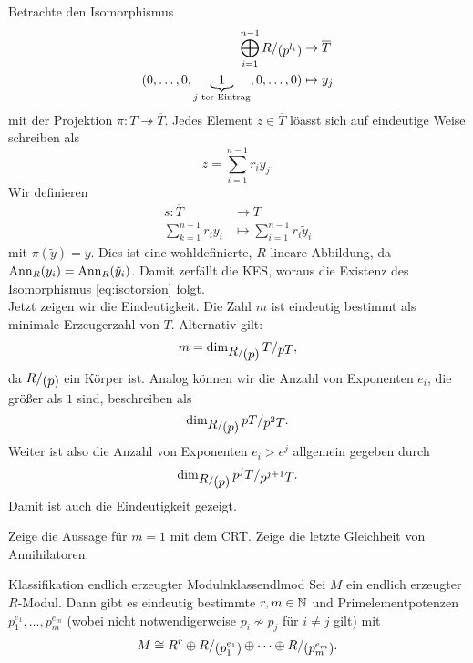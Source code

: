\begin{beweis}
Betrachte den Isomorphismus
\begin{equation}
\begin{split}
\bigoplus_{i=1}^{n-1} \quotient{R}{(p^{l_i})} &\to \overline{T}\\
(0,\dots,0,\underbrace{1}_{j\text{-ter Eintrag}},0,\dots,0) &\mapsto y_j
\end{split}
\end{equation}
mit der Projektion $\pi: T \twoheadrightarrow \overline{T}$. Jedes Element $z \in \overline{T}$ löasst sich auf eindeutige Weise schreiben als 
\begin{equation}
z = \sum_{i=1}^{n-1} r_iy_j.
\end{equation}
Wir definieren
\begin{equation}
\begin{split}
s: \overline{T} &\to T\\
\sum_{k=1}^{n-1} r_i y_i &\mapsto \sum_{i=1}^{n-1} r_i \tilde{y}_i
\end{split}
\end{equation}
mit $\pi (\tilde{y}) =y$. Dies ist eine wohldefinierte, $R$-lineare Abbildung, da $\operatorname{\text{Ann}}_R(y_i) = \operatorname{\text{Ann}}_R(\tilde{y}_i)$. Damit zerfällt die KES, woraus die Existenz des Isomorphismus \ref{eq:isotorsion} folgt.\\
Jetzt zeigen wir die Eindeutigkeit. Die Zahl $m$ ist eindeutig bestimmt als minimale Erzeugerzahl von $T$. Alternativ gilt:
\begin{equation}
m = \dim_{\quotient{R}{(p)}} \quotient{T}{pT},
\end{equation}
da $\quotient{R}{(p)}$ ein Körper ist. Analog können wir die Anzahl von Exponenten $e_i$, die größer als $1$ sind, beschreiben als
\begin{equation}
\dim_{\quotient{R}{(p)}} \quotient{pT}{p^2T}.
\end{equation}
Weiter ist also die Anzahl von Exponenten $e_i > e^j$ allgemein gegeben durch
\begin{equation}
\dim_{\quotient{R}{(p)}}\quotient{p^jT}{p^{j+1}T}.
\end{equation}
Damit ist auch die Eindeutigkeit gezeigt.
\end{beweis}
\begin{übung}
Zeige die Aussage für $m=1$ mit dem CRT. Zeige die letzte Gleichheit von Annihilatoren.
\end{übung}
\begin{korollar}{Klassifikation endlich erzeugter Moduln}{klassendlmod}
Sei $M$ ein endlich erzeugter $R$-Modul. Dann gibt es eindeutig bestimmte $r, m \in \mathbb{N}$ und Primelementpotenzen $p_1^{e_1}, \dots, p_m^{e_m}$ (wobei nicht notwendigerweise $p_i \nsim p_j$ für $i \neq j$ gilt) mit
\begin{equation}
M \cong R^r \oplus \quotient{R}{(p_1^{e_1})} \oplus \cdots \oplus \quotient{R}{(p_m^{e_m})}.
\end{equation}
\end{korollar}
